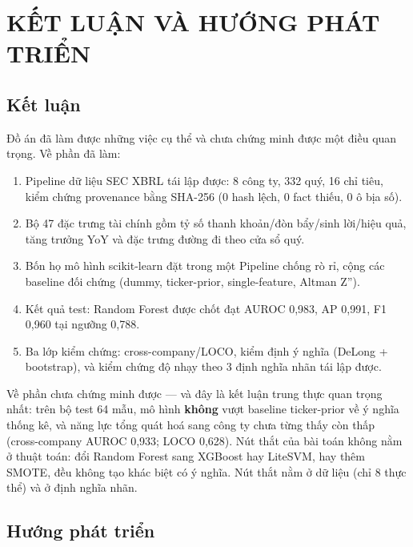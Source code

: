 \documentclass[13pt,a4paper]{extreport}
\begin{document}
\clearpage

\chapter{KẾT LUẬN VÀ HƯỚNG PHÁT TRIỂN}

\section{Kết luận}

Đồ án đã làm được những việc cụ thể và chưa chứng minh được một điều quan trọng. Về phần đã làm:

\begin{enumerate}
\item Pipeline dữ liệu SEC XBRL tái lập được: 8 công ty, 332 quý, 16 chỉ tiêu, kiểm chứng provenance bằng SHA-256 (0 hash lệch, 0 fact thiếu, 0 ô bịa số).
\item Bộ 47 đặc trưng tài chính gồm tỷ số thanh khoản/đòn bẩy/sinh lời/hiệu quả, tăng trưởng YoY và đặc trưng đường đi theo cửa sổ quý.
\item Bốn họ mô hình scikit-learn đặt trong một Pipeline chống rò rỉ, cộng các baseline đối chứng (dummy, ticker-prior, single-feature, Altman Z'').
\item Kết quả test: Random Forest được chốt đạt AUROC 0,983, AP 0,991, F1 0,960 tại ngưỡng 0,788.
\item Ba lớp kiểm chứng: cross-company/LOCO, kiểm định ý nghĩa (DeLong + bootstrap), và kiểm chứng độ nhạy theo 3 định nghĩa nhãn tái lập được.
\end{enumerate}

Về phần chưa chứng minh được — và đây là kết luận trung thực quan trọng nhất: trên bộ test 64 mẫu, mô hình \textbf{không} vượt baseline ticker-prior về ý nghĩa thống kê, và năng lực tổng quát hoá sang công ty chưa từng thấy còn thấp (cross-company AUROC 0,933; LOCO 0,628). Nút thắt của bài toán không nằm ở thuật toán: đổi Random Forest sang XGBoost hay LiteSVM, hay thêm SMOTE, đều không tạo khác biệt có ý nghĩa. Nút thắt nằm ở dữ liệu (chỉ 8 thực thể) và ở định nghĩa nhãn.

\section{Hướng phát triển}
\end{document}

